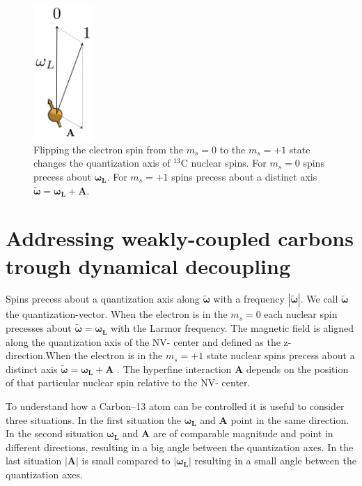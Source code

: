 \begin{figure}[htbp]
\centering
\includegraphics[keepaspectratio,width=0.2\textwidth,height=0.75\textheight]{./img/QuantizationAxis.png}
\caption{Flipping the electron spin from the  $m_s=0$ to the $m_s= +1$ state changes the quantization axis of $^{13}\mathrm{C}$ nuclear spins. For  $m_s=0$ spins precess about $\bm{\omega_L}$. For  $m_s=+1$ spins precess about a distinct axis $\bm{\tilde{\omega}}=\bm{\omega_L} +\bm{A}$.}
\label{fig:quantax}
\end{figure}




\section{Addressing weakly-coupled carbons trough dynamical decoupling}
\label{controllingacarbonthroughdynamicaldecoupling}
Spins precess about a quantization axis along $ \bm{\tilde{\omega}}$ with a frequency $|\bm{\tilde{\omega}}|$. We call $ \bm{\tilde{\omega}} $ the quantization-vector. When the electron is in the $m_s=0$ each nuclear spin precesses about $\bm{\tilde{\omega}} = \bm{\omega_L}$ with the Larmor frequency. The magnetic field is aligned along the quantization axis of the NV- center and defined as the z-direction.When the electron is in the $m_s=+1$ state nuclear spins precess about a distinct axis $\bm{\tilde{\omega}}=\bm{\omega_L} +\bm{A}$ \citep{Taminiau2012Detection}. The hyperfine interaction $\bm{A}$ depends on the position of that particular nuclear spin relative to the NV- center.

To understand how a Carbon--13 atom can be controlled it is useful to consider three situations. In the first situation the $\bm{\omega_L}$ and $\bm{A}$ point in the same direction. In the second situation $\bm{\omega_L}$ and $\bm{A}$ are of comparable magnitude and point in different directions, resulting in a big angle between the quantization axes. In the last situation $|\bm{A}|$ is small compared to  $\bm{|\omega_L|}$ resulting in a small angle between the quantization axes.

